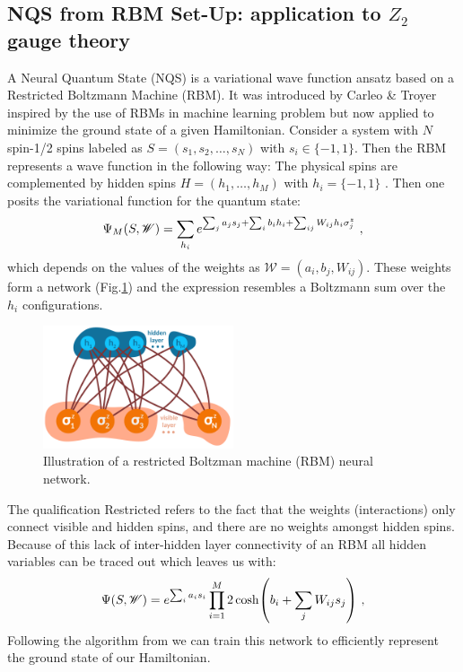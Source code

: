 \subsection{NQS from RBM Set-Up: application to $Z_2$ gauge theory}
A Neural Quantum State (NQS) is a variational wave function ansatz based on a Restricted Boltzmann Machine (RBM). It
was introduced by Carleo \& Troyer \cite{doi:10.1126/science.aag2302} inspired by the use of RBMs in machine learning problem but now applied to minimize the ground state of a given Hamiltonian. Consider a system with $N$ spin-1/2 spins labeled as $S = (s_1, s_2, \dots, s_N)$ with $s_i \in \{-1,1\}$. Then the RBM represents a wave function in the following way: The physical spins are complemented by hidden spins $H= (h_1,\dots,h_M)$ with $h_i = \{-1,1\}$ . Then one posits the variational function for the quantum state:
\begin{equation}
	\Psi_M(S,\mathcal{W}) = \sum_{h_i} e^{\sum_j a_j s_j + \sum_i b_i h_i + \sum_{ij} W_{ij}h_i\sigma_j^z} \ ,
\end{equation}
which depends on the values of the weights as $\mathcal{W}=(a_i, b_j, W_{ij})$. These weights form 
a network (Fig.\ref{fig:rbm}) and the expression resembles a Boltzmann sum over the $h_i$ configurations.
\begin{figure}[H]
	\centering
	\includegraphics[width=0.5\textwidth]{figures/chapter3/rbm.pdf}
	\caption{Illustration of a restricted Boltzman machine (RBM) neural network.}
	\label{fig:rbm}
\end{figure}
\noindent
The qualification Restricted refers to the fact that the weights (interactions) only connect visible and hidden spins, and there are no weights amongst hidden spins. Because of this lack of inter-hidden layer connectivity of an RBM  all hidden variables can be traced out which leaves us with:
\begin{equation}
	\Psi(S,\mathcal{W}) = e^{\sum_i a_i s_i} \prod_{i=1}^{M} 2 \cosh(b_i + \sum_j W_{ij}s_j) \ ,
\end{equation}    
Following the algorithm from \cite{doi:10.1126/science.aag2302} we can train this network to efficiently represent the ground state of our Hamiltonian.


